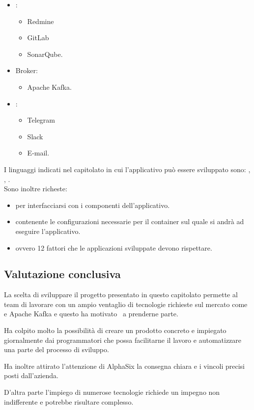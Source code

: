     \begin{itemize}
        \item {}:
        \begin{itemize}
            \item Redmine
            \item GitLab
            \item SonarQube.
        \end{itemize}
        \item Broker:
        \begin{itemize}
            \item Apache Kafka.
        \end{itemize}
        \item {}:
        \begin{itemize}
            \item Telegram
            \item Slack
            \item E-mail.
        \end{itemize}
    \end{itemize}
    I linguaggi indicati nel capitolato in cui l'applicativo può essere sviluppato sono: , , .\\
    Sono inoltre richeste:
    \begin{itemize}
        \item {} per interfacciarsi con i componenti dell'applicativo.
        \item {} contenente le configurazioni necessarie per il container sul quale si andrà ad eseguire l'applicativo.
        \item {} ovvero 12 fattori che le applicazioni sviluppate devono rispettare.
    \end{itemize}

    \subsection{Valutazione conclusiva}
    La scelta di sviluppare il progetto presentato in questo capitolato permette al team di lavorare con un ampio ventaglio di tecnologie
    richieste sul mercato come  e Apache Kafka e questo ha motivato \gruppo\ a prenderne parte.\par
    Ha colpito molto la possibilità di creare un prodotto concreto e impiegato giornalmente dai programmatori che possa facilitarne il lavoro
    e automatizzare una parte del processo di sviluppo.\par
    Ha inoltre attirato l'attenzione di AlphaSix la consegna chiara e i vincoli precisi posti dall'azienda.\par
    D'altra parte l'impiego di numerose tecnologie richiede un impegno non indifferente e potrebbe risultare complesso.
